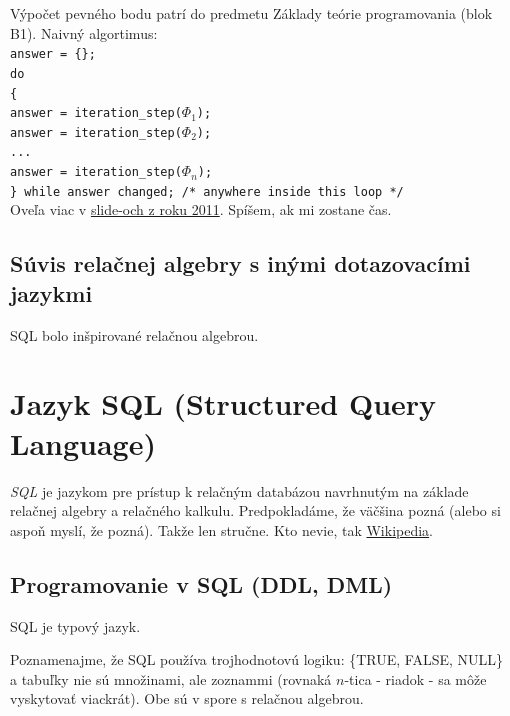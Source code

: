 \documentclass[10pt,a4paper]{article}
\begin{document}
Výpočet pevného bodu patrí do predmetu Základy teórie programovania (blok B1). 
Naivný algortimus: \\
\verb|answer = {};| \\
\verb|do| \\
\verb|{| \\
\verb|answer = iteration_step(|$\Phi_1$\verb|);| \\
\verb|answer = iteration_step(|$\Phi_2$\verb|);| \\
\verb|...| \\
\verb|answer = iteration_step(|$\Phi_n$\verb|);| \\
\verb|} while answer changed; /* anywhere inside this loop */| \\

Oveľa viac v \href{http://www.dcs.fmph.uniba.sk/~plachetk/TEACHING/DB2011/db2011_5.pdf}{slide-och z roku 2011}. Spíšem, ak mi zostane čas. 


\subsection{Súvis relačnej algebry s inými dotazovacími jazykmi}
\label{relacna_algebra_suvis}

SQL bolo inšpirované relačnou algebrou. 
    
\section{Jazyk SQL (Structured Query Language)} 
\emph{SQL} je jazykom pre prístup k relačným databázou navrhnutým na základe relačnej algebry a relačného kalkulu. 
Predpokladáme, že väčšina pozná (alebo si aspoň myslí, že pozná). Takže len stručne. 
Kto nevie, tak \href{http://en.wikipedia.org/wiki/SQL}{Wikipedia}. 

\subsection{Programovanie v SQL (DDL, DML)}

SQL je typový jazyk.

Poznamenajme, že SQL používa trojhodnotovú logiku: \{TRUE, FALSE, NULL\}
a tabuľky nie sú množinami, ale zoznammi (rovnaká $n$-tica - riadok - sa môže vyskytovať viackrát). Obe sú v spore s relačnou algebrou. 
\end{document}
